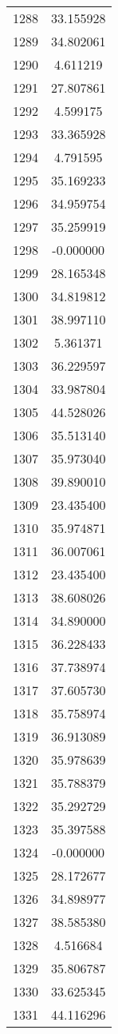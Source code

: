 \documentclass[12pt]{article}
\begin{document}
\begin{longtable}{@{}cc@{}}
1288 & 33.155928 \\
1289 & 34.802061 \\
1290 & 4.611219 \\
1291 & 27.807861 \\
1292 & 4.599175 \\
1293 & 33.365928 \\
1294 & 4.791595 \\
1295 & 35.169233 \\
1296 & 34.959754 \\
1297 & 35.259919 \\
1298 & -0.000000 \\
1299 & 28.165348 \\
1300 & 34.819812 \\
1301 & 38.997110 \\
1302 & 5.361371 \\
1303 & 36.229597 \\
1304 & 33.987804 \\
1305 & 44.528026 \\
1306 & 35.513140 \\
1307 & 35.973040 \\
1308 & 39.890010 \\
1309 & 23.435400 \\
1310 & 35.974871 \\
1311 & 36.007061 \\
1312 & 23.435400 \\
1313 & 38.608026 \\
1314 & 34.890000 \\
1315 & 36.228433 \\
1316 & 37.738974 \\
1317 & 37.605730 \\
1318 & 35.758974 \\
1319 & 36.913089 \\
1320 & 35.978639 \\
1321 & 35.788379 \\
1322 & 35.292729 \\
1323 & 35.397588 \\
1324 & -0.000000 \\
1325 & 28.172677 \\
1326 & 34.898977 \\
1327 & 38.585380 \\
1328 & 4.516684 \\
1329 & 35.806787 \\
1330 & 33.625345 \\
1331 & 44.116296 \\

\end{longtable}
\end{document}

